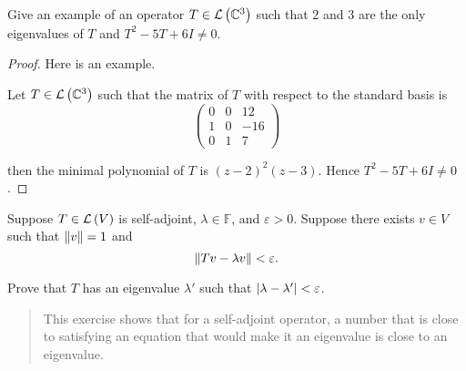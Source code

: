 \begin{exercise}
    Give an example of an operator $T \in \mathcal{L}\left({\mathbb{C}^{3}}\right)$ such that $2$ and $3$ are the only eigenvalues of $T$ and $T^{2} - 5T + 6I\ne 0$.
\end{exercise}

\begin{proof}
    Here is an example.

    Let $T\in\mathcal{L}\left({\mathbb{C}^{3}}\right)$ such that the matrix of $T$ with respect to the standard basis is
    \[
        \begin{pmatrix}
            0 & 0 & 12  \\
            1 & 0 & -16 \\
            0 & 1 & 7
        \end{pmatrix}
    \]

    then the minimal polynomial of $T$ is ${(z-2)}^{2}(z-3)$. Hence $T^{2} - 5T + 6I\ne 0$.
\end{proof}
\newpage

\begin{exercise}
    Suppose $T \in \mathcal{L}\left({V}\right)$ is self-adjoint, $\lambda \in \mathbb{F}$, and $\varepsilon > 0$. Suppose there exists $v \in V$ such that $\left\Vert{v}\right\Vert = 1$ and
    \[
        \left\Vert{Tv - \lambda v}\right\Vert < \varepsilon.
    \]

    Prove that $T$ has an eigenvalue $\lambda'$ such that $\left\vert{\lambda - \lambda'}\right\vert < \varepsilon$.
\end{exercise}

\begin{quote}
    This exercise shows that for a self-adjoint operator, a number that is close to satisfying an equation that would make it an eigenvalue is close to an eigenvalue.
\end{quote}

